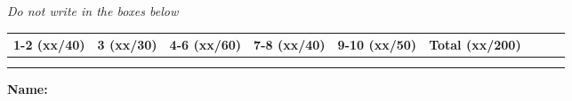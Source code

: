 \documentclass[11pt]{article}
\begin{document}
\vspace*{0.05in}
\begin{center}
{\it Do not write in the boxes below}
\end{center}

\begin{center}
\begin{tabular}{|l|l|l|l|l|l|l|l|l|} \hline \hline
{\bf 1-2 (xx/40)} & {\bf 3 (xx/30)} & {\bf 4-6 (xx/60)} & {\bf 7-8
  (xx/40)} & {\bf 9-10 (xx/50)} & {\bf Total
  (xx/200)}  \\ \hline 
& & & & & \\ 
& & & & & \\ \hline \hline
\end{tabular}
\end{center}

\vspace{.1in}
{\bf\Large{Name:}}

\newpage
\pagestyle{fancy}








\label{lastpage}
\end{document}
